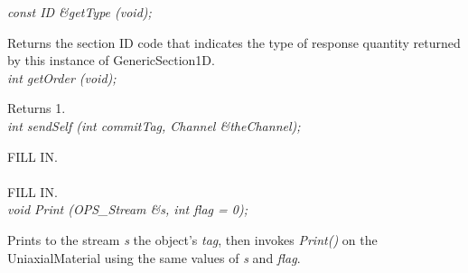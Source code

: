 {\em const ID \&getType (void); } 

Returns the section ID code that indicates the type of response quantity 
returned by this instance of GenericSection1D. \\

{\em int getOrder (void); } 

Returns 1. \\

{\em int sendSelf (int commitTag, Channel \&theChannel); }

FILL IN. \\

\\
FILL IN. \\

{\em void Print (OPS_Stream \&s, int flag = 0);} 

Prints to the stream {\em s} the object's {\em tag}, then invokes
{\em Print()} on the UniaxialMaterial using the same values of {\em s}
and {\em flag}. \\
